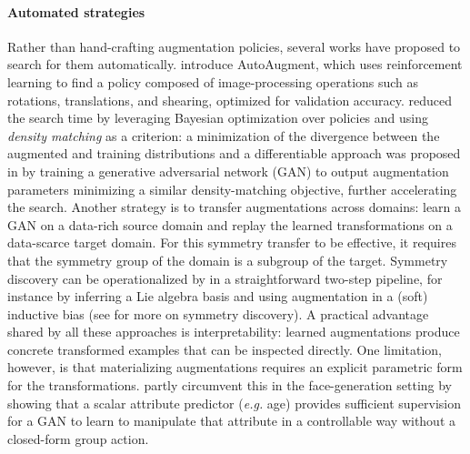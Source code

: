 \documentclass[mathematics,review,submit,moreauthors]{Definitions/mdpi}
\begin{document}
\paragraph{Automated  strategies}\label{par:auto-da}
Rather than hand-crafting augmentation policies, several works have proposed to search for them automatically.
\citet{cubuk20192iccvprc} introduce AutoAugment, which uses reinforcement learning to find a policy composed of image-processing operations such as rotations, translations, and shearing, optimized for validation accuracy.
\citet{lim2019anips} reduced the search time by leveraging Bayesian optimization over policies and using \textit{density matching} as a criterion: a minimization of the divergence between the augmented and training distributions and a differentiable approach was proposed in \citet{hataya2020cv-e2} by training a generative adversarial network (GAN) to output augmentation parameters minimizing a similar density-matching objective, further accelerating the search.
Another strategy is to transfer augmentations across domains: \citet{antoniou2018} learn a GAN on a data-rich source domain and replay the learned transformations on a data-scarce target domain.
For this symmetry transfer to be effective, it requires that the symmetry group of the domain is a subgroup of the target. 
Symmetry discovery can be operationalized by in a straightforward two-step pipeline, for instance by inferring a Lie algebra basis and using augmentation in a (soft) inductive bias \citep{escriche2025,yang2023p4icml} (see  for more on symmetry discovery).
A practical advantage shared by all these approaches is interpretability: learned augmentations produce concrete transformed examples that can be inspected directly.
One limitation, however, is that materializing augmentations requires an explicit parametric form for the transformations.
\citet{shoshan2021} partly circumvent this in the face-generation setting by showing that a scalar attribute predictor (\textit{e.g.} age) provides sufficient supervision for a GAN to learn to manipulate that attribute in a controllable way without a closed-form group action.
\end{document}
